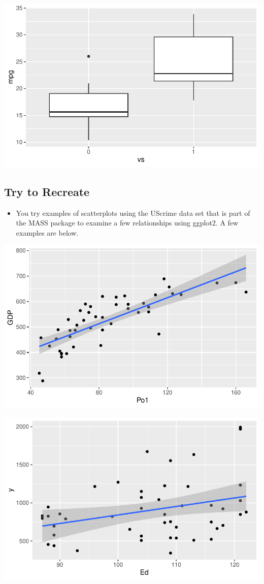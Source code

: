 \documentclass[
  letterpaper,
  DIV=11,
  numbers=noendperiod]{scrreprt}
\providecommand{\tightlist}{%
  \setlength{\itemsep}{0pt}\setlength{\parskip}{0pt}}\usepackage{longtable,booktabs,array}
\begin{document}
\includegraphics{dataviz_files/figure-pdf/unnamed-chunk-56-1.pdf}

\subsection{Try to Recreate}\label{try-to-recreate}

\begin{itemize}
\tightlist
\item
  You try examples of scatterplots using the UScrime data set that is
  part of the MASS package to examine a few relationships using ggplot2.
  A few examples are below.
\end{itemize}

\includegraphics{dataviz_files/figure-pdf/unnamed-chunk-57-1.pdf}

\includegraphics{dataviz_files/figure-pdf/unnamed-chunk-57-2.pdf}
\end{document}

